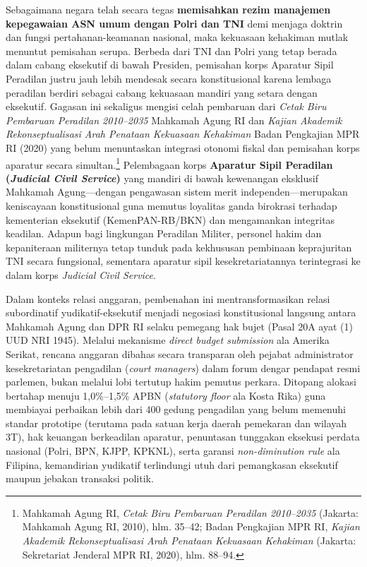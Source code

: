 \documentclass[12pt,a4paper,twocolumn]{article}
\begin{document}
Sebagaimana negara telah secara tegas \textbf{memisahkan rezim manajemen kepegawaian ASN umum dengan Polri dan TNI} demi menjaga doktrin dan fungsi pertahanan-keamanan nasional, maka kekuasaan kehakiman mutlak menuntut pemisahan serupa. Berbeda dari TNI dan Polri yang tetap berada dalam cabang eksekutif di bawah Presiden, pemisahan korps Aparatur Sipil Peradilan justru jauh lebih mendesak secara konstitusional karena lembaga peradilan berdiri sebagai cabang kekuasaan mandiri yang setara dengan eksekutif. Gagasan ini sekaligus mengisi celah pembaruan dari \textit{Cetak Biru Pembaruan Peradilan 2010--2035} Mahkamah Agung RI dan \textit{Kajian Akademik Rekonseptualisasi Arah Penataan Kekuasaan Kehakiman} Badan Pengkajian MPR RI (2020) yang belum menuntaskan integrasi otonomi fiskal dan pemisahan korps aparatur secara simultan.\footnote{Mahkamah Agung RI, \textit{Cetak Biru Pembaruan Peradilan 2010--2035} (Jakarta: Mahkamah Agung RI, 2010), hlm. 35--42; Badan Pengkajian MPR RI, \textit{Kajian Akademik Rekonseptualisasi Arah Penataan Kekuasaan Kehakiman} (Jakarta: Sekretariat Jenderal MPR RI, 2020), hlm. 88--94.} Pelembagaan korps \textbf{Aparatur Sipil Peradilan (\textit{Judicial Civil Service})} yang mandiri di bawah kewenangan eksklusif Mahkamah Agung—dengan pengawasan sistem merit independen—merupakan keniscayaan konstitusional guna memutus loyalitas ganda birokrasi terhadap kementerian eksekutif (KemenPAN-RB/BKN) dan mengamankan integritas keadilan. Adapun bagi lingkungan Peradilan Militer, personel hakim dan kepaniteraan militernya tetap tunduk pada kekhususan pembinaan keprajuritan TNI secara fungsional, sementara aparatur sipil kesekretariatannya terintegrasi ke dalam korps \textit{Judicial Civil Service}.

Dalam konteks relasi anggaran, pembenahan ini mentransformasikan relasi subordinatif yudikatif-eksekutif menjadi negosiasi konstitusional langsung antara Mahkamah Agung dan DPR RI selaku pemegang hak bujet (Pasal 20A ayat (1) UUD NRI 1945). Melalui mekanisme \textit{direct budget submission} ala Amerika Serikat, rencana anggaran dibahas secara transparan oleh pejabat administrator kesekretariatan pengadilan (\textit{court managers}) dalam forum dengar pendapat resmi parlemen, bukan melalui lobi tertutup hakim pemutus perkara. Ditopang alokasi bertahap menuju 1,0\%--1,5\% APBN (\textit{statutory floor} ala Kosta Rika) guna membiayai perbaikan lebih dari 400 gedung pengadilan yang belum memenuhi standar prototipe (terutama pada satuan kerja daerah pemekaran dan wilayah 3T), hak keuangan berkeadilan aparatur, penuntasan tunggakan eksekusi perdata nasional (Polri, BPN, KJPP, KPKNL), serta garansi \textit{non-diminution rule} ala Filipina, kemandirian yudikatif terlindungi utuh dari pemangkasan eksekutif maupun jebakan transaksi politik.
\end{document}
